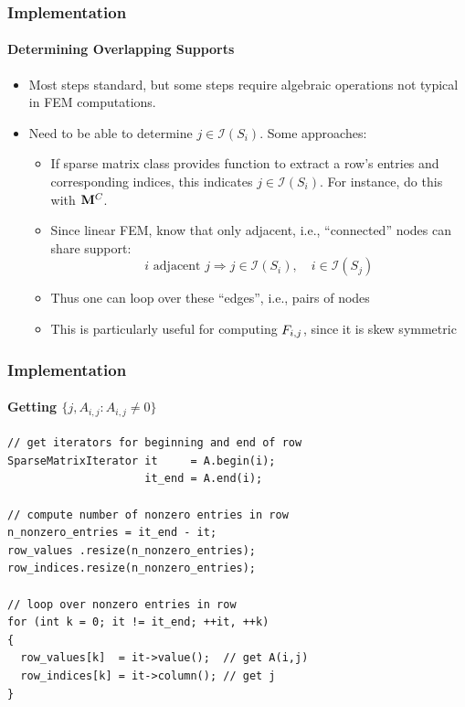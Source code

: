 \documentclass{beamer}
\begin{document}
\begin{frame}
\frametitle{Implementation}
\framesubtitle{Determining Overlapping Supports}

\begin{itemize}
   \item Most steps standard, but some steps require algebraic operations
      not typical in FEM computations.
   \item Need to be able to determine $j\in\mathcal{I}(S_i)$.
      Some approaches:
      \begin{itemize}
         \item If sparse matrix class provides function to extract
            a row's entries and corresponding indices, this indicates
            $j\in\mathcal{I}(S_i)$. For instance, do this with $\mathbf{M}^C$.
         \item Since linear FEM, know that only adjacent, i.e., ``connected''
            nodes can share support:
            \[i \mbox{ adjacent } j\Rightarrow j\in\mathcal{I}(S_i),\quad
               i\in\mathcal{I}(S_j)\]
            \item Thus one can loop over these ``edges'', i.e., pairs of nodes
            \item This is particularly useful for computing $F_{i,j}$, since it
               is skew symmetric
      \end{itemize}
\end{itemize}

\end{frame}
\begin{frame}
\frametitle{Implementation}
\framesubtitle{\texttt{Less Common deal.II Features Used}

\begin{itemize}
  \item \texttt{FunctionParser}
  \item \texttt{ParameterHandler}
\end{itemize}

\end{frame}
\begin{frame}[fragile=singleslide]
\frametitle{Implementation}
\framesubtitle{Getting $\{j, A_{i,j}: A_{i,j}\ne 0\}$}

\begin{lstlisting}
// get iterators for beginning and end of row
SparseMatrixIterator it     = A.begin(i);
                     it_end = A.end(i);

// compute number of nonzero entries in row
n_nonzero_entries = it_end - it;
row_values .resize(n_nonzero_entries);
row_indices.resize(n_nonzero_entries);

// loop over nonzero entries in row
for (int k = 0; it != it_end; ++it, ++k)
{
  row_values[k]  = it->value();  // get A(i,j)
  row_indices[k] = it->column(); // get j
}
\end{lstlisting}

\end{frame}
\end{document}
